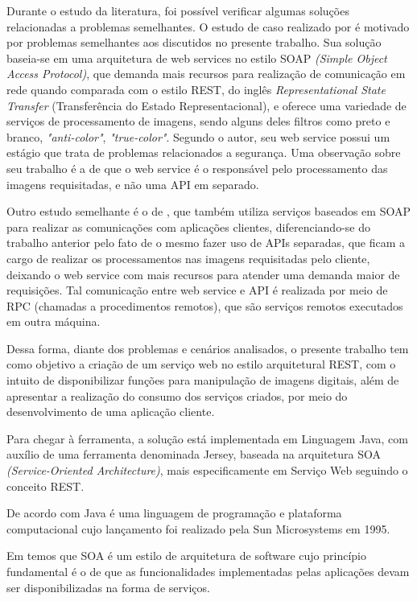 \documentclass[12pt]{article}
\begin{document}
Durante o estudo da literatura, foi possível verificar algumas soluções relacionadas a problemas semelhantes. O estudo de caso realizado por \cite{vivek} é motivado por problemas semelhantes aos discutidos no presente
trabalho. Sua solução baseia-se em uma arquitetura de web services no estilo SOAP \textit{(Simple Object Access Protocol)}, que demanda mais recursos para realização de comunicação em rede quando comparada com o estilo REST, do inglês
\textit{Representational State Transfer} (Transferência do Estado Representacional), e oferece uma variedade de serviços de processamento de imagens, sendo alguns deles filtros como preto e branco, \textit{"anti-color"}, \textit{"true-color"}. Segundo o autor, seu web service possui um estágio que trata de problemas relacionados a segurança. Uma observação sobre seu trabalho é a de que o web service é o responsável pelo processamento das imagens requisitadas, e não uma API em separado.


Outro estudo semelhante é o de \cite{martin}, que também utiliza serviços baseados em SOAP para realizar as comunicações com aplicações clientes, diferenciando-se do trabalho anterior pelo fato de o mesmo fazer uso de APIs separadas, que ficam a cargo de realizar os processamentos nas imagens requisitadas pelo cliente, deixando o web service com mais recursos para atender uma demanda maior de requisições. Tal comunicação entre web service e API é realizada por meio de RPC (chamadas a procedimentos remotos), que são serviços remotos executados em outra máquina. 

Dessa forma, diante dos problemas e cenários analisados, o presente trabalho tem como objetivo a criação de um serviço web no estilo arquitetural REST, com o intuito de disponibilizar funções para manipulação de imagens digitais, além de apresentar a realização do consumo dos serviços criados, por meio do desenvolvimento de uma aplicação cliente.


Para chegar à ferramenta, a solução está implementada em Linguagem
Java, com auxílio de uma ferramenta denominada Jersey, baseada na arquitetura
SOA \textit{(Service-Oriented Architecture)}, mais especificamente em Serviço Web seguindo o conceito REST. 

De acordo com \cite{oracle} Java é uma linguagem de programação e plataforma computacional cujo lançamento foi realizado pela Sun Microsystems em 1995.

Em \cite{soa1,soa2} temos que SOA é um estilo de arquitetura de software cujo princípio fundamental é o de que as funcionalidades implementadas pelas aplicações devam ser disponibilizadas na forma de serviços.
\end{document}
